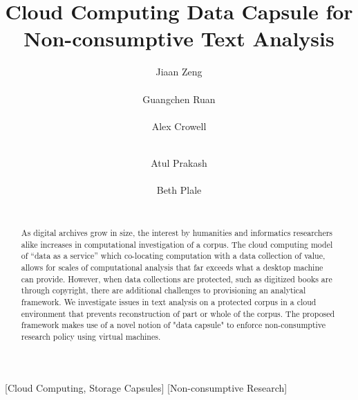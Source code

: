 \documentclass{acm_proc_article-sp}
\begin{document}
\title{Cloud Computing Data Capsule for Non-consumptive Text Analysis}

\author{
\alignauthor
Jiaan Zeng \\
       \\
\alignauthor
Guangchen Ruan \\
       \\
\alignauthor 
Alex Crowell \\
       \\
\and  %
\alignauthor 
Atul Prakash \\
       \\
\alignauthor Beth Plale \\
       \\
}

\maketitle
\begin{abstract}
As digital archives grow in size, the interest by humanities and informatics
researchers alike increases in computational investigation of a corpus.  The
cloud computing model of ``data as a service'' which co-locating computation with
a data collection of value, allows for scales of computational analysis that
far exceeds what a desktop machine can provide. However, when data collections
are protected, such as digitized books are through copyright, there are
additional challenges to provisioning an analytical framework. We investigate
issues in text analysis on a protected corpus in a cloud environment that
prevents reconstruction of part or whole of the corpus.  The proposed framework
makes use of a novel notion of "data capsule" to enforce non-consumptive
research policy using virtual machines.
\end{abstract}


[Cloud Computing, Storage Capsules]
[Non-consumptive Research]
\end{document}
